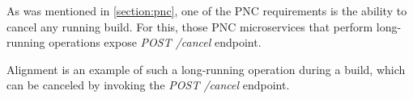 \documentclass[../main.tex]{subfiles}
\begin{document}
As was mentioned in \ref{section:pnc}, one of the PNC requirements is the ability to cancel any running build. For this, those PNC microservices that perform long-running operations expose \textit{POST /cancel} endpoint.

Alignment is an example of such a long-running operation during a build, which can be canceled by invoking the \textit{POST /cancel} endpoint.
\end{document}
